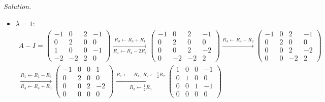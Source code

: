 \documentclass[12pt]{article}
\theoremstyle{definition}
\newenvironment{solution}{\par\noindent\textit{Solution.}\ }{\par\smallskip}
\begin{document}
\begin{solution}
\begin{itemize}
\[\begin{gathered}
\xrightarrow{R_3\leftrightarrow R_4}
\begin{pmatrix}1&0&2&-1\\0&1&0&0\\0&0&6&0\\0&0&0&0\end{pmatrix}
\\
\xrightarrow{R_3\leftarrow\frac16R_3}
\begin{pmatrix}1&0&2&-1\\0&1&0&0\\0&0&1&0\\0&0&0&0\end{pmatrix}
\xrightarrow{R_1\leftarrow R_1-2R_3}
\begin{pmatrix}1&0&0&-1\\0&1&0&0\\0&0&1&0\\0&0&0&0\end{pmatrix}
\end{gathered}
\]
The special solution \((1,0,0,1)'\) is a basis of \(\mathcal N(A+I)\) (Theorem~\ref{thm:r4-four-bases}(c)).
\item \(\lambda=1\):
\[
\begin{gathered}
A-I=\begin{pmatrix}-1&0&2&-1\\0&2&0&0\\1&0&0&-1\\-2&-2&2&0\end{pmatrix}
\xrightarrow[R_4\leftarrow R_4-2R_1]{R_3\leftarrow R_3+R_1}
\begin{pmatrix}-1&0&2&-1\\0&2&0&0\\0&0&2&-2\\0&-2&-2&2\end{pmatrix}
\xrightarrow{R_4\leftarrow R_4+R_2}
\begin{pmatrix}-1&0&2&-1\\0&2&0&0\\0&0&2&-2\\0&0&-2&2\end{pmatrix}
\\
\xrightarrow[R_4\leftarrow R_4+R_3]{R_1\leftarrow R_1-R_3}
\begin{pmatrix}-1&0&0&1\\0&2&0&0\\0&0&2&-2\\0&0&0&0\end{pmatrix}
\xrightarrow[R_3\leftarrow\frac12R_3]{R_1\leftarrow-R_1,\ R_2\leftarrow\frac12R_2}
\begin{pmatrix}1&0&0&-1\\0&1&0&0\\0&0&1&-1\\0&0&0&0\end{pmatrix}

\end{gathered}\]
\end{itemize}
\end{solution}
\end{document}
